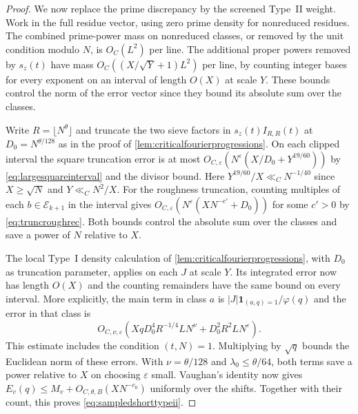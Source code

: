 \documentclass[11pt,a4paper]{article}
\numberwithin{equation}{section}
\begin{document}
\begin{proof}
We now replace the prime discrepancy by the screened
Type~II weight. Work in the full residue vector, using
zero prime density for nonreduced residues. The combined
prime-power mass on nonreduced classes, or removed by the
unit condition modulo $N$, is $O_C(L^2)$ per line.
The additional proper powers removed by $s_z(t)$ have
mass $O_C((X/\sqrt Y+1)L^2)$ per line, by counting
integer bases for every exponent on an interval of
length $O(X)$ at scale $Y$. These bounds control the
norm of the error vector since they bound its absolute
sum over the classes.

Write $R=\lfloor N^\theta\rfloor$ and truncate the two
sieve factors in $s_z(t)I_{R,R}(t)$ at $D_0=N^{\theta/128}$
as in the proof of \cref{lem:criticalfourierprogressions}.
On each clipped interval the square truncation error
is at most
$O_{C,\varepsilon}(N^\varepsilon(X/D_0+Y^{19/60}))$
by \cref{eq:largesquareinterval} and the divisor bound.
Here $Y^{19/60}/X\ll_C N^{-1/40}$ since
$X\ge\sqrt N$ and $Y\ll_C N^2/X$.
For the roughness truncation, counting multiples of
each $b\in\mathcal E_{k+1}$ in the interval gives
$O_{C,\varepsilon}(N^\varepsilon(XN^{-c'}+D_0))$ for
some $c'>0$ by \cref{eq:truncroughrec}. Both bounds
control the absolute sum over the classes and save a
power of $N$ relative to $X$.

The local Type~I density calculation of
\cref{lem:criticalfourierprogressions}, with $D_0$ as
truncation parameter, applies on each $J$ at scale $Y$.
Its integrated error now has length $O(X)$ and the
counting remainders have the same bound on every
interval. More explicitly, the main term in class $a$
is $|J|\mathbf1_{(a,q)=1}/\varphi(q)$ and the error in
that class is
\[
 O_{C,\nu,\varepsilon}\!\left(
 XqD_0^4 R^{-1/4} L N^\nu
     + D_0^2 R^2 L N^\varepsilon\right).
\]
This estimate includes the condition $(t,N)=1$.
Multiplying by $\sqrt q$ bounds the Euclidean norm of
these errors. With $\nu=\theta/128$ and
$\lambda_0\le\theta/64$, both terms save a power relative
to $X$ on choosing $\varepsilon$ small. Vaughan's
identity now gives $E_v(q)\le M_v+O_{C,\theta,B}(X N^{-c_0})$
uniformly over the shifts. Together with their count,
this proves \cref{eq:sampledshorttypeii}.
\end{proof}
\end{document}
